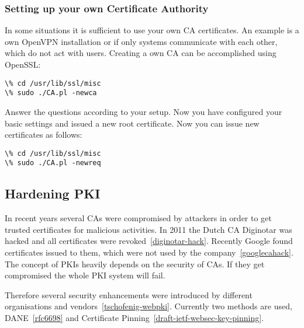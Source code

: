 \subsubsection{Setting up your own Certificate Authority}
\label{sec:setupownca}
In some situations it is sufficient to use your own CA certificates. An example is a own OpenVPN
installation or if only systems communicate with each other, which do not act with users. Creating
a own CA can be accomplished using OpenSSL:

\begin{lstlisting}
\% cd /usr/lib/ssl/misc
\% sudo ./CA.pl -newca
\end{lstlisting}

Answer the questions according to your setup. Now you have configured your basic settings and 
issued a new root certificate. Now you can issue new certificates as follows:

\begin{lstlisting}
\% cd /usr/lib/ssl/misc
\% sudo ./CA.pl -newreq
\end{lstlisting}

\subsection{Hardening PKI}
\label{sec:hardeningpki}
In recent years several CAs were compromised by attackers in order to
get trusted certificates for malicious activities. In 2011 the Dutch
CA Diginotar was hacked and all certificates were
revoked~\ref{diginotar-hack}. Recently Google found certificates
issued to them, which were not used by the
company~\ref{googlecahack}. The concept of PKIs heavily depends on the
security of CAs.  If they get compromised the whole PKI system will
fail.

Therefore several security enhancements were introduced by different
organisations and vendors~\ref{tschofenig-webpki}. Currently two
methods are used, DANE~\ref{rfc6698} and Certificate
Pinning~\ref{draft-ietf-websec-key-pinning}.





